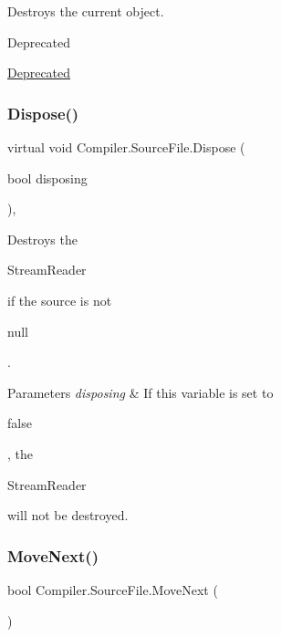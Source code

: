 Destroys the current object. \begin{DoxyRefDesc}{Deprecated}
\item[\mbox{\hyperlink{deprecated__deprecated000001}{Deprecated}}]\end{DoxyRefDesc}
\mbox{\label{class_compiler_1_1_source_file_a71c994b257804a95d0f05f7347b10879}} 
\subsubsection{\texorpdfstring{Dispose()}{Dispose()}\hspace{0.1cm}{\footnotesize\ttfamily [2/2]}}
{\footnotesize\ttfamily virtual void Compiler.\+Source\+File.\+Dispose (\begin{DoxyParamCaption}\item[{bool}]{disposing }\end{DoxyParamCaption})\hspace{0.3cm}{\ttfamily [protected]}, {\ttfamily [virtual]}}

Destroys the
\begin{DoxyCode}
StreamReader 
\end{DoxyCode}
 if the source is not
\begin{DoxyCode}
null 
\end{DoxyCode}
 . 
\begin{DoxyParams}{Parameters}
{\em disposing} & If this variable is set to
\begin{DoxyCode}
\textcolor{keyword}{false} 
\end{DoxyCode}
 , the
\begin{DoxyCode}
StreamReader 
\end{DoxyCode}
 will not be destroyed. \\
\hline
\end{DoxyParams}
\mbox{\label{class_compiler_1_1_source_file_ad80d0f3a9ead18dce6baad58971838bb}} 
\subsubsection{\texorpdfstring{Move\+Next()}{MoveNext()}}
{\footnotesize\ttfamily bool Compiler.\+Source\+File.\+Move\+Next (\begin{DoxyParamCaption}{ }\end{DoxyParamCaption})}

